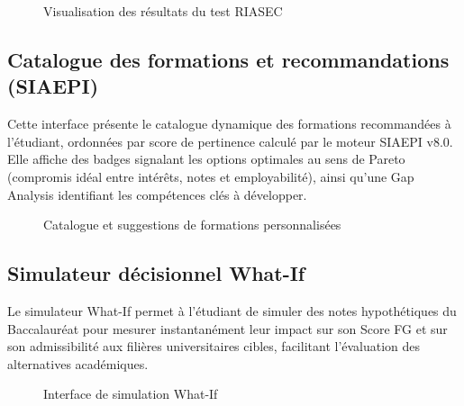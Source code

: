\begin{figure}[H]
    \centering
    \caption{Visualisation des résultats du test RIASEC}
    \label{fig:interface_resultats_riasec}
\end{figure}

\subsection{Catalogue des formations et recommandations (SIAEPI)}

Cette interface présente le catalogue dynamique des formations recommandées à l'étudiant, ordonnées par score de pertinence calculé par le moteur SIAEPI v8.0. Elle affiche des badges signalant les options optimales au sens de Pareto (compromis idéal entre intérêts, notes et employabilité), ainsi qu'une Gap Analysis identifiant les compétences clés à développer.

\begin{figure}[H]
    \centering
    \caption{Catalogue et suggestions de formations personnalisées}
    \label{fig:interface_catalogue_recommandations}
\end{figure}

\subsection{Simulateur décisionnel What-If}

Le simulateur What-If permet à l'étudiant de simuler des notes hypothétiques du Baccalauréat pour mesurer instantanément leur impact sur son Score FG et sur son admissibilité aux filières universitaires cibles, facilitant l'évaluation des alternatives académiques.

\begin{figure}[H]
    \centering
    \caption{Interface de simulation What-If}
    \label{fig:interface_whatif}
\end{figure}

